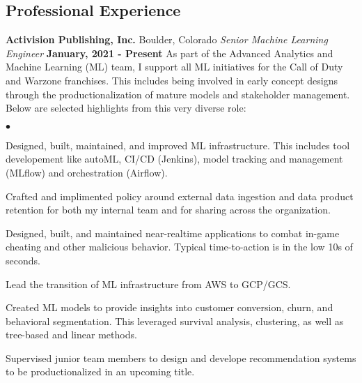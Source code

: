 \documentclass[margin,line, 11pt]{res}
\newenvironment{list2}{
  \begin{list}{$\bullet$}{%
      \setlength{\itemsep}{0in}
      \setlength{\parsep}{0in} \setlength{\parskip}{0in}
      \setlength{\topsep}{0in} \setlength{\partopsep}{0in}
      \setlength{\leftmargin}{0.2in}}}{\end{list}}
\begin{document}
\begin{resume}
\section{Professional \newline Experience}
\textbf{Activision Publishing, Inc.} \hfill Boulder, Colorado\newline
\textit{Senior Machine Learning Engineer} \hfill \textbf{January, 2021 - Present}\newline
As part of the Advanced Analytics and Machine Learning (ML) team, I support all ML initiatives for the Call of Duty and Warzone franchises. This includes being involved in early concept designs through the productionalization of mature models and stakeholder management. Below are selected highlights from this very diverse role:
    \begin{list2}
      \item Designed, built, maintained, and improved ML infrastructure. This includes tool developement like autoML, CI/CD (Jenkins), model tracking and management (MLflow) and orchestration (Airflow).
      \item Crafted and implimented policy around external data ingestion and data product retention for both my internal team and for sharing across the organization.
      \item Designed, built, and maintained near-realtime applications to combat in-game cheating and other malicious behavior. Typical time-to-action is in the low 10s of seconds.
      \item Lead the transition of ML infrastructure from AWS to GCP/GCS.
      \item Created ML models to provide insights into customer conversion, churn, and behavioral segmentation. This leveraged survival analysis, clustering, as well as tree-based and linear methods.
      \item Supervised junior team members to design and develope recommendation systems to be productionalized in an upcoming title. 
    \end{list2}


\end{resume}
\end{document}
